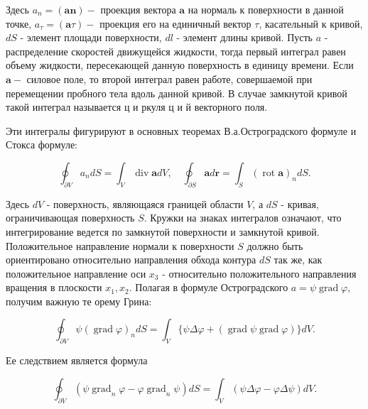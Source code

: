 \documentclass[10pt]{article}
\begin{document}
Здесь $a_{n}=(\boldsymbol{a n})-$ проекция вектора $\boldsymbol{a}$ на нормаль к поверхности в данной точке, $a_{\tau}=(\boldsymbol{a} \tau)-$ проекция его на единичный вектор $\tau$, касательный к кривой, $d S$ - элемент площади поверхности, $d l$ - элемент длины кривой. Пусть $a$ - распределение скоростей движущейся жидкости, тогда первый интеграл равен объему жидкости, пересекающей данную поверхность в единицу времени. Если $\boldsymbol{a}-$ силовое поле, то второй интеграл равен работе, совершаемой при перемещении пробного тела вдоль данной кривой. В случае замкнутой кривой такой интеграл называется ц и ркуля ц и й векторного поля.



Эти интегралы фигурируют в основных теоремах В.а.Остроградского формуле и Стокса формуле:



\[

\oint_{\partial V} a_{n} d S=\int_{V} \operatorname{div} \boldsymbol{a} d V, \quad \oint_{\partial S} \boldsymbol{a} d \boldsymbol{r}=\int_{S}(\operatorname{rot} \boldsymbol{a})_{n} d S .

\]



Здесь $d V$ - поверхность, являющаяся границей области $V$, а $d S$ - кривая, ограничивающая поверхность $S$. Кружки на знаках интегралов означают, что интегрирование ведется по замкнутой поверхности и замкнутой кривой. Положительное направление нормали к поверхности $S$ должно быть ориентировано относительно направления обхода контура $d S$ так же, как положительное направление оси $x_{3}$ - относительно положительного направления вращения в плоскости $x_{1}, x_{2}$. Полагая в формуле Остроградского $a=\psi \operatorname{grad} \varphi$, получим важную те орему Грина:



\[

\oint_{\partial V} \psi(\operatorname{grad} \varphi)_{n} d S=\int_{V}\{\psi \Delta \varphi+(\operatorname{grad} \psi \operatorname{grad} \varphi)\} d V .

\]



Ее следствием является формула



\[

\oint_{\partial V}\left(\psi \operatorname{grad}_{n} \varphi-\varphi \operatorname{grad}_{n} \psi\right) d S=\int_{V}(\psi \Delta \varphi-\varphi \Delta \psi) d V .

\]
\end{document}
